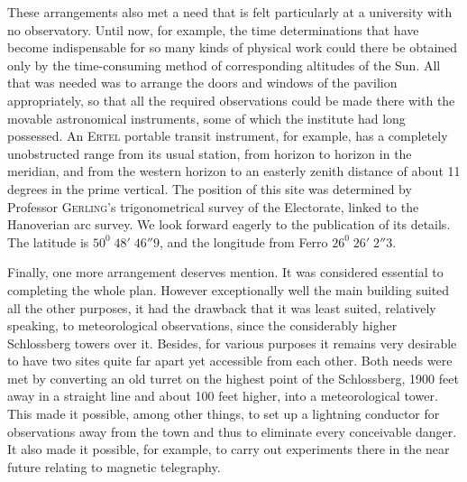 These arrangements also met a need that is felt particularly at a university with no observatory. Until now, for example, the time determinations that have become indispensable for so many kinds of physical work could there be obtained only by the time-consuming method of corresponding altitudes of the Sun. All that was needed was to arrange the doors and windows of the pavilion appropriately, so that all the required observations could be made there with the movable astronomical instruments, some of which the institute had long possessed. An \textsc{Ertel} portable transit instrument, for example, has a completely unobstructed range from its usual station, from horizon to horizon in the meridian, and from the western horizon to an easterly zenith distance of about 11 degrees in the prime vertical. The position of this site
was determined by Professor \textsc{Gerling}’s trigonometrical survey of the Electorate, linked to the Hanoverian arc survey. We look forward eagerly to the publication of its details. The latitude is $50^0\;48'\;46''9$, and the longitude from Ferro $26^0\;26'\;2''3$.

Finally, one more arrangement deserves mention. It was considered essential to completing the whole plan. However exceptionally well the main building suited all the other purposes, it had the drawback that it was least suited, relatively speaking, to meteorological observations, since the considerably higher Schlossberg towers over it. Besides, for various purposes it remains very desirable to have two sites quite far apart yet accessible from each other. Both needs were met by converting an old turret on the highest point of the Schlossberg, 1900 feet away in a straight line and about 100 feet higher, into a meteorological tower. This made it possible, among other things, to set up a lightning conductor for observations away from the town and thus to eliminate every conceivable danger. It also made it possible, for example, to carry out experiments there in the near future relating to magnetic telegraphy.

